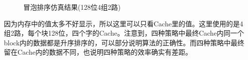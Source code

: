 \documentclass[12pt]{article} %
\begin{document}
\begin{sloppypar}
\begin{figure}[htbp]
\centering
{}




\centering
\caption{冒泡排序仿真结果(128位4组2路)}
\end{figure}

因为内存中的值太多不好显示，所以这里可以只看Cache里的值。这里使用的是4组2路，每个块128位，四个字的Cache。注意到，四种策略中最终Cache内同一个block内的数据都是升序排序的，可以部分说明算法的正确性。而四种策略中最终留在Cache内的数据不同，也说明四种策略的效率确实有差距。


\end{sloppypar}
\end{document}

